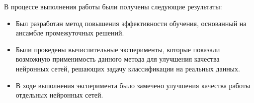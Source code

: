 \documentclass[12pt, fleqn]{article}
\begin{document}
В процессе выполнения работы были получены следующие результаты:
\begin{itemize}
\item Был разработан метод повышения эффективности обучения, основанный на ансамбле промежуточных решений.
\item Были проведены вычислительные эксперименты, которые показали возможную применимость данного метода для улучшения качества нейронных сетей, решающих задачу классификации на реальных данных.
\item В ходе выполнения эксперимента было замечено улучшения качества работы отдельных нейронных сетей.
\end{itemize}

\def\BibUrl#1.{}\def\BibAnnote#1.{}


\end{document}
